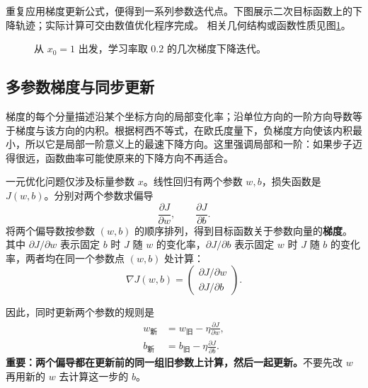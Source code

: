 重复应用梯度更新公式，便得到一系列参数迭代点。下图展示二次目标函数上的下降轨迹；实际计算可交由数值优化程序完成。
相关几何结构或函数性质见图\ref{fig:quadratic-objective}。
\begin{figure}[htbp]\centering
{}
\caption{从 $x_0=1$ 出发，学习率取 $0.2$ 的几次梯度下降迭代。}\label{fig:quadratic-objective}
\end{figure}

\subsection{多参数梯度与同步更新}

梯度的每个分量描述沿某个坐标方向的局部变化率；沿单位方向的一阶方向导数等于梯度与该方向的内积。根据柯西不等式，在欧氏度量下，负梯度方向使该内积最小，所以它是局部一阶意义上的最速下降方向。这里强调局部和一阶：如果步子迈得很远，函数曲率可能使原来的下降方向不再适合。

一元优化问题仅涉及标量参数 $x$。线性回归有两个参数 $w,b$，损失函数是 $J(w,b)$。分别对两个参数求偏导
\[
\frac{\partial J}{\partial w},\qquad \frac{\partial J}{\partial b}.
\]
将两个偏导数按参数 $(w,b)$ 的顺序排列，得到目标函数关于参数向量的\textbf{梯度}。其中 $\partial J/\partial w$ 表示固定 $b$ 时 $J$ 随 $w$ 的变化率，$\partial J/\partial b$ 表示固定 $w$ 时 $J$ 随 $b$ 的变化率，两者均在同一个参数点 $(w,b)$ 处计算：
\begin{equation}\label{eq:gradient-two}
\nabla J(w,b)=
\begin{pmatrix}
\partial J/\partial w\\[2pt]\partial J/\partial b
\end{pmatrix}.
\end{equation}

因此，同时更新两个参数的规则是
\begin{equation}\label{eq:gd-update}
\boxed{\begin{aligned}
w_{\text{新}}&=w_{\text{旧}}-\eta\frac{\partial J}{\partial w},\\
b_{\text{新}}&=b_{\text{旧}}-\eta\frac{\partial J}{\partial b}.
\end{aligned}}
\end{equation}
\textbf{重要：两个偏导都在更新前的同一组旧参数上计算，然后一起更新。}不要先改 $w$ 再用新的 $w$ 去计算这一步的 $b$。

